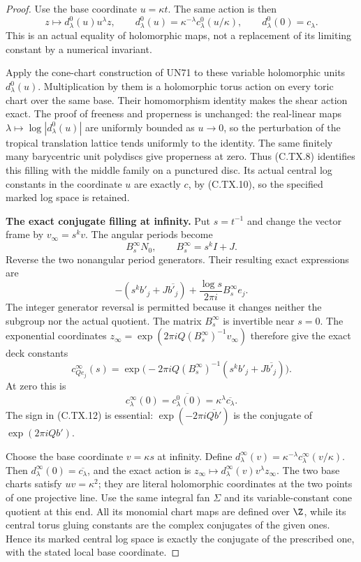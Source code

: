 \begin{proof}
Use the base coordinate $u=\kappa t$.
The same action is then
\[
 z\longmapsto d^0_\lambda(u)u^\lambda z,
 \qquad
 d^0_\lambda(u)=\kappa^{-\lambda}
                    c^0_\lambda(u/\kappa),
 \qquad d^0_\lambda(0)=c_\lambda.
\tag{C.TX.10}
\]
This is an actual equality of holomorphic
maps, not a replacement of its limiting
constant by a numerical invariant.

Apply the cone-chart construction of
UN71 to these variable holomorphic
units $d^0_\lambda(u)$. Multiplication
by them is a holomorphic torus action
on every toric chart over the same
base. Their homomorphism identity
makes the shear action exact. The
proof of freeness and properness is
unchanged: the real-linear maps
$\lambda\mapsto\log|d^0_\lambda(u)|$
are uniformly bounded as $u\to0$,
so the perturbation of the tropical
translation lattice tends uniformly
to the identity. The same finitely
many barycentric unit polydiscs give
properness at zero. Thus (C.TX.8)
identifies this filling with the
middle family on a punctured disc.
Its actual central log constants in
the coordinate $u$ are exactly $c$,
by (C.TX.10), so the specified
marked log space is retained.

\par\medskip\noindent\textbf{The exact conjugate filling at infinity.}
Put $s=t^{-1}$ and change the vector
frame by $v_\infty=s^kv$. The angular
periods become
\[
 B^\infty_sN_0,
       \qquad B^\infty_s=s^kI+J.
\tag{C.TX.11}
\]
Reverse the two nonangular period
generators. Their resulting exact
expressions are
\[
 -(s^kb'_j+J\overline{b'_j})
                +\frac{\log s}{2\pi i}B^\infty_se_j.
\tag{C.TX.12}
\]
The integer generator reversal is
permitted because it changes neither
the subgroup nor the actual quotient.
The matrix $B^\infty_s$ is invertible
near $s=0$. The exponential coordinates
$z_\infty=\exp(2\pi iQ(B^\infty_s)^{-1}v_\infty)$
therefore give the exact deck constants
\[
 c^\infty_{Qe_j}(s)=
  \exp\bigl(-2\pi iQ(B^\infty_s)^{-1}
                  (s^kb'_j+J\overline{b'_j})\bigr).
\tag{C.TX.13}
\]
At zero this is
\[
 c^\infty_\lambda(0)
       =\overline{c^0_\lambda(0)}
       =\kappa^\lambda\overline{c_\lambda}.
\tag{C.TX.14}
\]
The sign in (C.TX.12) is essential:
$\exp(-2\pi i\overline{Qb'})$
is the conjugate of $\exp(2\pi iQb')$.

Choose the base coordinate $v=\kappa s$
at infinity. Define
$d^\infty_\lambda(v)=\kappa^{-\lambda}
c^\infty_\lambda(v/\kappa)$.
Then $d^\infty_\lambda(0)=\overline{c_\lambda}$,
and the exact action is
$z_\infty\mapsto d^\infty_\lambda(v)v^\lambda z_\infty$.
The two base charts satisfy $uv=\kappa^2$;
they are literal holomorphic coordinates
at the two points of one projective line.
Use the same integral fan $\Sigma$ and
its variable-constant cone quotient
at this end. All its monomial chart
maps are defined over $\Z$, while its
central torus gluing constants are
the complex conjugates of the given
ones. Hence its marked central log
space is exactly the conjugate of
the prescribed one, with the stated
local base coordinate.


\end{proof}
